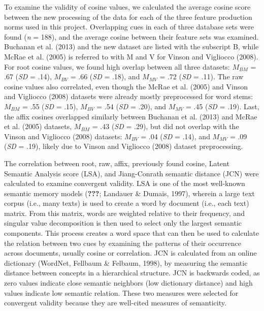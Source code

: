 \documentclass[english,,man]{apa6}
\theoremstyle{definition}
\theoremstyle{definition}
\theoremstyle{definition}
\theoremstyle{remark}
\begin{document}
To examine the validity of cosine values, we calculated the average
cosine score between the new processing of the data for each of the
three feature production norms used in this project. Overlapping cues in
each of three database sets were found (\emph{n} = 188), and the average
cosine between their feature sets was examined. Buchanan et al. (2013)
and the new dataset are listed with the subscript B, while McRae et al.
(2005) is referred to with M and V for Vinson and Vigliocco (2008). For
root cosine values, we found high overlap between all three datasets:
\(M_{BM}\) = .67 (\emph{SD} = .14), \(M_{BV}\) = .66 (\emph{SD} = .18),
and \(M_{MV}\) = .72 (\emph{SD} = .11). The raw cosine values also
correlated, even though the McRae et al. (2005) and Vinson and Vigliocco
(2008) datasets were already mostly preprocessed for word stems:
\(M_{BM}\) = .55 (\emph{SD} = .15), \(M_{BV}\) = .54 (\emph{SD} = .20),
and \(M_{MV}\) = .45 (\emph{SD} = .19). Last, the affix cosines
overlapped similarly between Buchanan et al. (2013) and McRae et al.
(2005) datasets, \(M_{BM}\) = .43 (\emph{SD} = .29), but did not overlap
with the Vinson and Vigliocco (2008) datasets: \(M_{BV}\) = .04
(\emph{SD} = .14), and \(M_{MV}\) = .09 (\emph{SD} = .19), likely due to
Vinson and Vigliocco (2008) dataset preprocessing.

The correlation between root, raw, affix, previously found cosine,
Latent Semantic Analysis score (LSA), and Jiang-Conrath semantic
distance (JCN) were calculated to examine convergent validity. LSA is
one of the most well-known semantic memory models ({\textbf{???}};
Landauer \& Dumais, 1997), wherein a large text corpus (i.e., many
texts) is used to create a word by document (i.e., each text) matrix.
From this matrix, words are weighted relative to their frequency, and
singular value decomposition is then used to select only the largest
semantic components. This process creates a word space that can then be
used to calculate the relation between two cues by examining the
patterns of their occurrence across documents, usually cosine or
correlation. JCN is calculated from an online dictionary (WordNet,
Fellbaum \& Felbaum, 1998), by measuring the semantic distance between
concepts in a hierarchical structure. JCN is backwards coded, as zero
values indicate close semantic neighbors (low dictionary distance) and
high values indicate low semantic relation. These two measures were
selected for convergent validity because they are well-cited measures of
semanticity.
\end{document}
